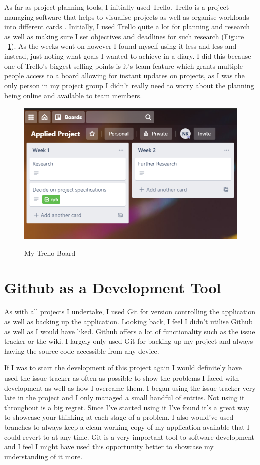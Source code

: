 As far as project planning tools, I initially used Trello. Trello is a project managing software that helps to visualise projects as well as organise workloads into different cards \cite{wiki:trello}. Initially, I used Trello quite a lot for planning and research as well as making sure I set objectives and deadlines for such research (Figure ~\ref{trello_label}). As the weeks went on however I found myself using it less and less and instead, just noting what goals I wanted to achieve in a diary. I did this because one of Trello's biggest selling points is it's team feature which grants multiple people access to a board allowing for instant updates on projects, as I was the only person in my project group I didn't really need to worry about the planning being online and available to team members.

\begin{figure}
        \centering
        \includegraphics[scale=0.6]{Images/Trello.png} 
        \label{trello_label}
        \caption{My Trello Board}
\end{figure}

\section{Github as a Development Tool}
As with all projects I undertake, I used Git for version controlling the application as well as backing up the application. Looking back, I feel I didn't utilise Github as well as I would have liked. Github offers a lot of functionality such as the issue tracker or the wiki. I largely only used Git for backing up my project and always having the source code accessible from any device.

If I was to start the development of this project again I would definitely have used the issue tracker as often as possible to show the problems I faced with development as well as how I overcame them. I began using the issue tracker very late in the project and I only managed a small handful of entries. Not using it throughout is a big regret. Since I've started using it I've found it's a great way to showcase your thinking at each stage of a problem. I also would've used branches to always keep a clean working copy of my application available that I could revert to at any time. Git is a very important tool to software development and I feel I might have used this opportunity better to showcase my understanding of it more.

